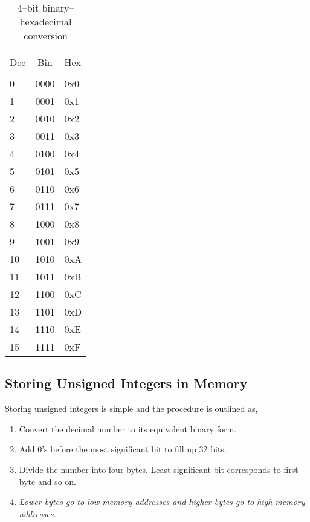 \documentclass[12pt,a4paper]{article}
\begin{document}
\begin{table}[H]
\centering
\label{4-bit-bin-hex-table}
	\begin{tabular}{l c l}
	\hline \hline \\ [-2ex]
	Dec & Bin & Hex\\
	\hline \\ [-2ex]
	0  & 0000 & 0x0\\
	1  & 0001 & 0x1\\
	2  & 0010 & 0x2\\
	3  & 0011 & 0x3\\
	4  & 0100 & 0x4\\
	5  & 0101 & 0x5\\
	6  & 0110 & 0x6\\
	7  & 0111 & 0x7\\
	8  & 1000 & 0x8\\
	9  & 1001 & 0x9\\
	10 & 1010 & 0xA\\
	11 & 1011 & 0xB\\
	12 & 1100 & 0xC\\
	13 & 1101 & 0xD\\
	14 & 1110 & 0xE\\
	15 & 1111 & 0xF\\
	\hline \hline
	\end{tabular}
\caption{4--bit binary--hexadecimal conversion}
\end{table}
\subsection{Storing Unsigned Integers in Memory}
Storing unsigned integers is simple and the procedure is outlined as,
\begin{enumerate}
\item Convert the decimal number to its equivalent binary form.
\item Add 0's before the most significant bit to fill up 32 bits\footnotemark[2].
\item Divide the number into four bytes. Least significant bit corresponds to first byte and so on.
\item \emph{Lower bytes go to low memory addresses and higher bytes go to high memory addresses.}
\end{enumerate}
\end{document}
